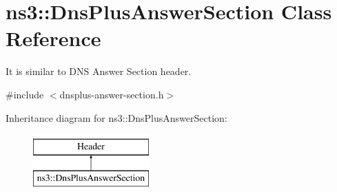 \hypertarget{classns3_1_1DnsPlusAnswerSection}{\section{ns3\-:\-:Dns\-Plus\-Answer\-Section Class Reference}
\label{classns3_1_1DnsPlusAnswerSection}
}


It is similar to D\-N\-S Answer Section header.  




{\ttfamily \#include $<$dnsplus-\/answer-\/section.\-h$>$}

Inheritance diagram for ns3\-:\-:Dns\-Plus\-Answer\-Section\-:\begin{figure}[H]
\begin{center}
\leavevmode
\includegraphics[height=2.000000cm]{classns3_1_1DnsPlusAnswerSection}
\end{center}
\end{figure}
